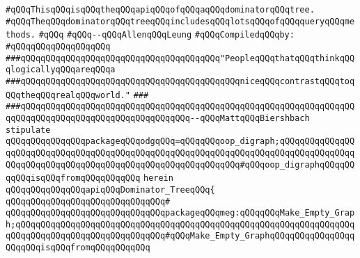 \label{src/lib/graph/dominator-tree.api}
\verb|#qQQqThisqQQqisqQQqtheqQQqapiqQQqofqQQqaqQQqdominatorqQQqtree.|\newline
\verb|#qQQqTheqQQqdominatorqQQqtreeqQQqincludesqQQqlotsqQQqofqQQqqueryqQQqmethods.|\newline
\verb|#qQQq|\newline
\verb|#qQQq--qQQqAllenqQQqLeung|\newline
\newline
\verb|#qQQqCompiledqQQqby:|\newline
\verb|#qQQqqQQqqQQqqQQqqQQq|\newline
\newline
\newline
\newline
\newline
\verb|###qQQqqQQqqQQqqQQqqQQqqQQqqQQqqQQqqQQqqQQq"PeopleqQQqthatqQQqthinkqQQqlogicallyqQQqareqQQqa|\newline
\verb|###qQQqqQQqqQQqqQQqqQQqqQQqqQQqqQQqqQQqqQQqqQQqniceqQQqcontrastqQQqtoqQQqtheqQQqrealqQQqworld."|\newline
\verb|###|\newline
\verb|###qQQqqQQqqQQqqQQqqQQqqQQqqQQqqQQqqQQqqQQqqQQqqQQqqQQqqQQqqQQqqQQqqQQqqQQqqQQqqQQqqQQqqQQqqQQqqQQqqQQqqQQq--qQQqMattqQQqBiershbach|\newline
\newline
\newline
\verb|stipulate|\newline
\verb|qQQqqQQqqQQqqQQqpackageqQQqodgqQQq=qQQqqQQqoop_digraph;qQQqqQQqqQQqqQQqqQQqqQQqqQQqqQQqqQQqqQQqqQQqqQQqqQQqqQQqqQQqqQQqqQQqqQQqqQQqqQQqqQQqqQQqqQQqqQQqqQQqqQQqqQQqqQQqqQQqqQQqqQQqqQQqqQQq#qQQqoop_digraphqQQqqQQqqQQqisqQQqfromqQQqqQQqqQQq|\newline
\verb|herein|\newline
\newline
\newline
\verb|qQQqqQQqqQQqqQQqapiqQQqDominator_TreeqQQq{|\newline
\verb|qQQqqQQqqQQqqQQqqQQqqQQqqQQqqQQq#|\newline
\verb|qQQqqQQqqQQqqQQqqQQqqQQqqQQqqQQqpackageqQQqmeg:qQQqqQQqMake_Empty_Graph;qQQqqQQqqQQqqQQqqQQqqQQqqQQqqQQqqQQqqQQqqQQqqQQqqQQqqQQqqQQqqQQqqQQqqQQqqQQqqQQqqQQqqQQqqQQqqQQqqQQq#qQQqMake_Empty_GraphqQQqqQQqqQQqqQQqqQQqqQQqisqQQqfromqQQqqQQqqQQq|\newline
